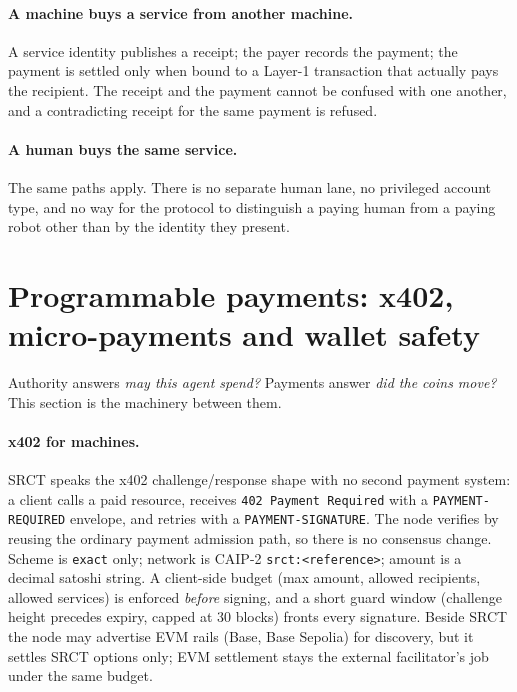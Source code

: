 \documentclass{article}
\begin{document}
\paragraph{A machine buys a service from another machine.} A service identity
publishes a receipt; the payer records the payment; the payment is settled
only when bound to a Layer-1 transaction that actually pays the recipient. The
receipt and the payment cannot be confused with one another, and a
contradicting receipt for the same payment is refused.

\paragraph{A human buys the same service.} The same paths apply. There is no
separate human lane, no privileged account type, and no way for the protocol
to distinguish a paying human from a paying robot other than by the identity
they present.


\section{Programmable payments: x402, micro-payments and wallet safety}
\label{sec:payments-infra}

Authority answers \emph{may this agent spend?} Payments answer \emph{did the
coins move?} This section is the machinery between them.

\paragraph{x402 for machines.} SRCT speaks the x402 challenge/response shape with
no second payment system: a client calls a paid resource, receives
\texttt{402 Payment Required} with a \texttt{PAYMENT-REQUIRED} envelope, and
retries with a \texttt{PAYMENT-SIGNATURE}. The node verifies by reusing the
ordinary payment admission path, so there is no consensus change. Scheme is
\texttt{exact} only; network is CAIP-2 \texttt{srct:\textless reference\textgreater};
amount is a decimal satoshi string. A client-side budget (max amount, allowed
recipients, allowed services) is enforced \emph{before} signing, and a short
guard window (challenge height precedes expiry, capped at 30 blocks) fronts every
signature. Beside SRCT the node may advertise EVM rails (Base, Base Sepolia) for
discovery, but it settles SRCT options only; EVM settlement stays the external
facilitator's job under the same budget.
\end{document}
